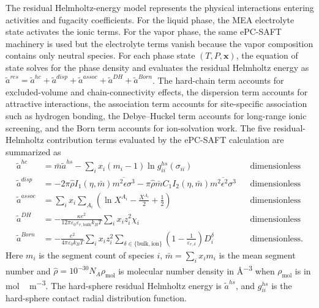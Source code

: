 The residual Helmholtz-energy model represents the physical interactions entering activities and fugacity coefficients.
For the liquid phase, the MEA electrolyte state activates the ionic terms.
For the vapor phase, the same ePC-SAFT machinery is used but the electrolyte terms vanish because the vapor composition contains only neutral species.
For each phase state $(T,P,\mathbf{x})$, the equation of state solves for the phase density and evaluates the residual Helmholtz energy as $\tilde{a}^{res}=\tilde{a}^{hc}+\tilde{a}^{disp}+\tilde{a}^{assoc}+\tilde{a}^{DH}+\tilde{a}^{Born}$.
The hard-chain term accounts for excluded-volume and chain-connectivity effects, the dispersion term accounts for attractive interactions, the association term accounts for site-specific association such as hydrogen bonding, the Debye--Huckel term accounts for long-range ionic screening, and the Born term accounts for ion-solvation work.
The five residual-Helmholtz contribution terms evaluated by the ePC-SAFT calculation are summarized as
\begin{align}
\tilde{a}^{hc}
&= \bar{m}\tilde{a}^{hs}
-\sum_i x_i(m_i-1)\ln g_{ii}^{hs}(\sigma_{ii})
&& \text{dimensionless}\label{eq:epcsaft-hc}\\
\tilde{a}^{disp}
&= -2\pi\widehat\rho I_1(\eta,\bar{m})\overline{m^2\epsilon\sigma^3}
-\pi\widehat\rho\bar{m}C_1I_2(\eta,\bar{m})\overline{m^2\epsilon^2\sigma^3}
&& \text{dimensionless}\label{eq:epcsaft-disp}\\
\tilde{a}^{assoc}
&= \sum_i x_i\sum_{A_i}
\left(\ln X^{A_i}-\frac{X^{A_i}}{2}+\frac{1}{2}\right)
&& \text{dimensionless}\label{eq:epcsaft-assoc}\\
\tilde{a}^{DH}
&=-\frac{\kappa e^{2}}{12\pi\varepsilon_{0}\varepsilon_{r,\mathrm{bulk}}k_{B}T}
\sum_i x_i z_i^2 \chi_i
&& \text{dimensionless}\label{eq:epcsaft-dh}\\
\tilde{a}^{Born}
&=
-\frac{e^2}{4\pi\varepsilon_0 k_B T}
\sum_i x_i z_i^2
\sum_{\delta\in\{\mathrm{bulk},\mathrm{ion}\}}
\left(1-\frac{1}{\varepsilon_{r,\delta}}\right)
D_i^{\delta}
&& \text{dimensionless}\label{eq:epcsaft-born}.
\end{align}
Here $m_i$ is the segment count of species $i$, $\bar{m}=\sum_i x_i m_i$ is the mean segment number and $\widehat\rho=10^{-30}N_A\rho_{\mathrm{mol}}$ is molecular number density in \unit{\angstrom^{-3}} when $\rho_{\mathrm{mol}}$ is in \unit{mol\,m^{-3}}.
The hard-sphere residual Helmholtz energy is $\tilde a^{hs}$, and $g_{ii}^{hs}$ is the hard-sphere contact radial distribution function.
